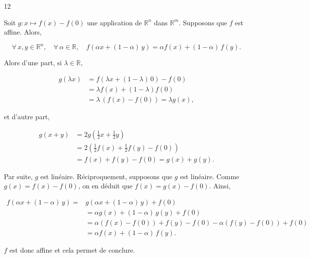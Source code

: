 \begin{reponse}{12}

Soit $g : x \longmapsto f(x) - f(0)$ une application de $\mathbb{R}^n$ dans $\mathbb{R}^m$. Supposons que $f$ est affine. Alors,

\[
    \forall \, x,y \in \mathbb{R}^n, \quad \forall \, \alpha \in \mathbb{R}, \quad f(\alpha x + (1- \alpha) \, y) = \alpha f(x) + (1- \alpha) \, f(y).
\]

Alors d'une part, si $\lambda \in \mathbb{R}$,

\begin{align*}
    g(\lambda x) & = f(\lambda x + (1-\lambda) \, 0) - f(0) \\
    & = \lambda f(x) + (1- \lambda) f(0) \\
    & = \lambda \, (f(x)-f(0)) = \lambda g(x),
\end{align*}

et d'autre part, 

\begin{align*}
    g(x+y) & =2g\left(\frac{1}{2} x+\frac{1}{2}y\right) \\
    & = 2\left( \frac{1}{2} f(x) + \frac{1}{2}f(y) - f(0) \right) \\
    & = f(x) + f(y)- f(0) = g(x) + g(y).
\end{align*}

Par suite, $g$ est linéaire. Réciproquement, supposons que $g$ est linéaire. Comme $g(x)=f(x)-f(0)$, on en déduit que $f(x) = g(x) - f(0)$. Ainsi, 

\begin{align*}
    f(\alpha x + (1- \alpha ) \, y) = & g(\alpha x + (1- \alpha ) \, y) + f(0) \\
    & = \alpha g(x) + (1- \alpha) \, g(y) + f(0) \\
    & = \alpha (f(x)-f(0))+f(y)-f(0)-\alpha (f(y)-f(0))+f(0) \\
    & = \alpha f(x) + (1- \alpha) \, f(y).
\end{align*}

$f$ est donc affine et cela permet de conclure.

\end{reponse}


